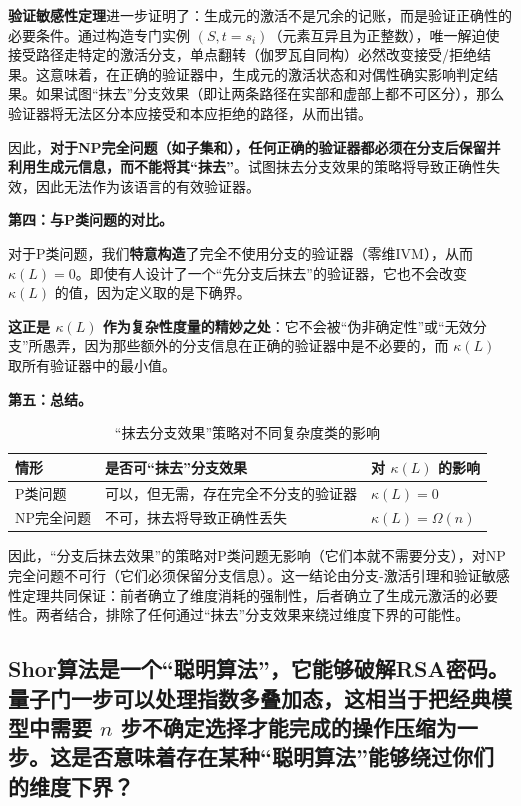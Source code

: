 \documentclass{ctexart}
\begin{document}
	\textbf{验证敏感性定理}进一步证明了：生成元的激活不是冗余的记账，而是验证正确性的必要条件。通过构造专门实例 $(S, t=s_i)$（元素互异且为正整数），唯一解迫使接受路径走特定的激活分支，单点翻转（伽罗瓦自同构）必然改变接受/拒绝结果。这意味着，在正确的验证器中，生成元的激活状态和对偶性确实影响判定结果。如果试图``抹去''分支效果（即让两条路径在实部和虚部上都不可区分），那么验证器将无法区分本应接受和本应拒绝的路径，从而出错。
	
	因此，\textbf{对于NP完全问题（如子集和），任何正确的验证器都必须在分支后保留并利用生成元信息，而不能将其``抹去''}。试图抹去分支效果的策略将导致正确性失效，因此无法作为该语言的有效验证器。
	
	\textbf{第四：与P类问题的对比。}
	
	对于P类问题，我们\textbf{特意构造}了完全不使用分支的验证器（零维IVM），从而 $\kappa(L) = 0$。即使有人设计了一个``先分支后抹去''的验证器，它也不会改变 $\kappa(L)$ 的值，因为定义取的是下确界。
	
	\textbf{这正是 $\kappa(L)$ 作为复杂性度量的精妙之处}：它不会被``伪非确定性''或``无效分支''所愚弄，因为那些额外的分支信息在正确的验证器中是不必要的，而 $\kappa(L)$ 取所有验证器中的最小值。
	
	\textbf{第五：总结。}
	
	\begin{table}[h]
		\centering
		\caption{``抹去分支效果''策略对不同复杂度类的影响}
		\begin{tabular}{p{3cm} p{5cm} p{4cm}}
			\hline
			\textbf{情形} & \textbf{是否可``抹去''分支效果} & \textbf{对 $\kappa(L)$ 的影响} \\
			\hline
			P类问题 & 可以，但无需，存在完全不分支的验证器 & $\kappa(L) = 0$ \\
			NP完全问题 & 不可，抹去将导致正确性丢失 & $\kappa(L) = \Omega(n)$ \\
			\hline
		\end{tabular}
	\end{table}
	
	因此，``分支后抹去效果''的策略对P类问题无影响（它们本就不需要分支），对NP完全问题不可行（它们必须保留分支信息）。这一结论由分支-激活引理和验证敏感性定理共同保证：前者确立了维度消耗的强制性，后者确立了生成元激活的必要性。两者结合，排除了任何通过``抹去''分支效果来绕过维度下界的可能性。
	
	
	\subsection{Shor算法是一个``聪明算法''，它能够破解RSA密码。量子门一步可以处理指数多叠加态，这相当于把经典模型中需要 $n$ 步不确定选择才能完成的操作压缩为一步。这是否意味着存在某种``聪明算法''能够绕过你们的维度下界？}
	
\end{document}

